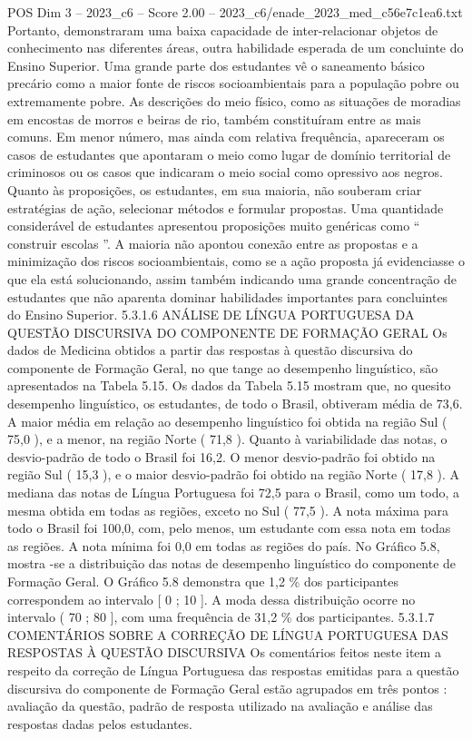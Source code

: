 \begin{textsample}{POS Dim 3 – 2023\_c6 – Score 2.00 – 2023\_c6/enade\_2023\_med\_c56e7c1ea6.txt}
Portanto, demonstraram uma baixa capacidade de inter-relacionar objetos de conhecimento nas diferentes áreas, outra habilidade esperada de um concluinte do Ensino Superior.
Uma grande parte dos estudantes vê o saneamento básico precário como a maior fonte de riscos socioambientais para a população pobre ou extremamente pobre.
As descrições do meio físico, como as situações de moradias em encostas de morros e beiras de rio, também constituíram entre as mais comuns.
Em menor número, mas ainda com relativa frequência, apareceram os casos de estudantes que apontaram o meio como lugar de domínio territorial de criminosos ou os casos que indicaram o meio social como opressivo aos negros.
Quanto às proposições, os estudantes, em sua maioria, não souberam criar estratégias de ação, selecionar métodos e formular propostas.
Uma quantidade considerável de estudantes apresentou proposições muito genéricas como “ construir escolas ”.
A maioria não apontou conexão entre as propostas e a minimização dos riscos socioambientais, como se a ação proposta já evidenciasse o que ela está solucionando, assim também indicando uma grande concentração de estudantes que não aparenta dominar habilidades importantes para concluintes do Ensino Superior. 5.3.1.6 ANÁLISE DE LÍNGUA PORTUGUESA DA QUESTÃO DISCURSIVA DO COMPONENTE DE FORMAÇÃO GERAL Os dados de Medicina obtidos a partir das respostas à questão discursiva do componente de Formação Geral, no que tange ao desempenho linguístico, são apresentados na Tabela 5.15.
Os dados da Tabela 5.15 mostram que, no quesito desempenho linguístico, os estudantes, de todo o Brasil, obtiveram média de 73,6.
A maior média em relação ao desempenho linguístico foi obtida na região Sul ( 75,0 ), e a menor, na região Norte ( 71,8 ).
Quanto à variabilidade das notas, o desvio-padrão de todo o Brasil foi 16,2.
O menor desvio-padrão foi obtido na região Sul ( 15,3 ), e o maior desvio-padrão foi obtido na região Norte ( 17,8 ).
A mediana das notas de Língua Portuguesa foi 72,5 para o Brasil, como um todo, a mesma obtida em todas as regiões, exceto no Sul ( 77,5 ).
A nota máxima para todo o Brasil foi 100,0, com, pelo menos, um estudante com essa nota em todas as regiões.
A nota mínima foi 0,0 em todas as regiões do país.
No Gráfico 5.8, mostra -se a distribuição das notas de desempenho linguístico do componente de Formação Geral.
O Gráfico 5.8 demonstra que 1,2 \% dos participantes correspondem ao intervalo [ 0 ; 10 ].
A moda dessa distribuição ocorre no intervalo ( 70 ; 80 ], com uma frequência de 31,2 \% dos participantes. 5.3.1.7 COMENTÁRIOS SOBRE A CORREÇÃO DE LÍNGUA PORTUGUESA DAS RESPOSTAS À QUESTÃO DISCURSIVA Os comentários feitos neste item a respeito da correção de Língua Portuguesa das respostas emitidas para a questão discursiva do componente de Formação Geral estão agrupados em três pontos : avaliação da questão, padrão de resposta utilizado na avaliação e análise das respostas dadas pelos estudantes.

\end{textsample}
